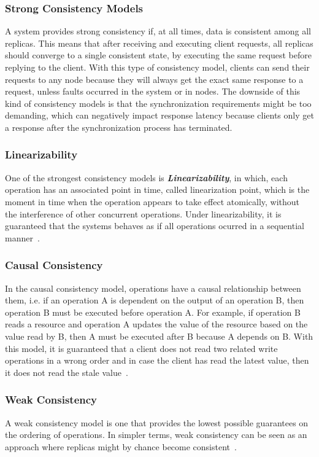 \subsubsection{Strong Consistency Models}
\label{sec:strong_consistency_models}
A system provides strong consistency if, at all times, data is consistent among all replicas. This means that after receiving and executing client requests, all replicas should converge to a single consistent state, by executing the same request before replying to the client. With this type of consistency model, clients can send their requests to any node because they will always get the exact same response to a request, unless faults occurred in the system or in nodes. The downside of this kind of consistency models is that the synchronization requirements might be too demanding, which can negatively impact response latency because clients only get a response after the synchronization process has terminated.

\subsubsection{Linearizability}
One of the strongest consistency models is \textbf{\textit{Linearizability}}, in which, each operation has an associated point in time, called linearization point, which is the moment in time when the operation appears to take effect atomically, without the interference of other concurrent operations. Under linearizability, it is guaranteed that the systems behaves as if all operations ocurred in a sequential manner~\cite{linearizability-geeks}.

\subsubsection{Causal Consistency}
\label{sec:causal-consistency}
In the causal consistency model, operations have a causal relationship between them, i.e. if an operation A is dependent on the output of an operation B, then operation B must be executed before operation A. For example, if operation B reads a resource and operation A updates the value of the resource based on the value read by B, then A must be executed after B because A depends on B. With this model, it is guaranteed that a client does not read two related write operations in a wrong order and in case the client has read the latest value, then it does not read the stale value~\cite{consistency-models}.

\subsubsection{Weak Consistency}
\label{sec:weak_consistency}
A weak consistency model is one that provides the lowest possible guarantees on the ordering of operations. In simpler terms, weak consistency can be seen as an approach where replicas might by chance become consistent~\cite{consistency-in-distributed-systems}.

